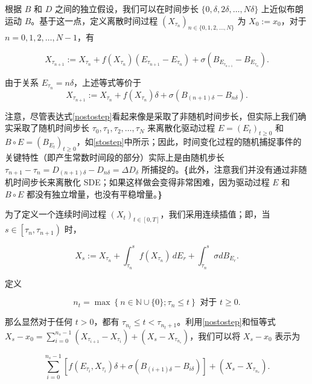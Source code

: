 根据 \( B \) 和 \( D \) 之间的独立假设，我们可以在时间步长 \(\{0, \delta, 2\delta, \ldots, N\delta\}\) 上近似布朗运动 \( B \)。基于这一点，定义离散时间过程 \(\left(X_{\tau_n}\right)_{n\in\{0,1,2,\ldots, N\}}\) 为 \( X_0 := x_0 \)，对于 \( n = 0, 1, 2, \ldots, N-1 \)，有

\begin{equation}\label{stostep}
	X_{\tau_{n+1}} := X_{\tau_n}  + f\left(X_{\tau_n}\right)\left(E_{\tau_{n+1}}-E_{\tau_n}\right)  + \sigma\left(B_{E_{\tau_{n+1}}}-B_{E_{\tau_n}}\right).
\end{equation}


由于关系 \( E_{\tau_{n}} = n\delta \)，上述等式等价于
\begin{equation}\label{nostostep}
	X_{\tau_{n+1}} :=X_{\tau_n}  + f\left(X_{\tau_n}\right)\delta + \sigma\left(B_{(n+1)\delta}-B_{n\delta}\right).
\end{equation}

注意，尽管表达式\cref{nostostep}看起来像是采取了非随机时间步长，但实际上我们确实采取了随机时间步长 \(\tau_0, \tau_1, \tau_2, \ldots, \tau_N\) 来离散化驱动过程 \( E = \left(E_t\right)_{t \geq 0} \) 和 \( B \circ E = \left(B_{E_t}\right)_{t \geq 0} \)，如\cref{stostep}中所示；因此，时间变化过程的随机捕捉事件的关键特性（即产生常数时间段的部分）实际上是由随机步长 \(\tau_{n+1} - \tau_n = D_{(n+1)\delta} - D_{n\delta} = \Delta D_{\delta}\) 所捕捉的。\textbf{\{}此外，注意我们并没有通过非随机时间步长来离散化 SDE；如果这样做会变得非常困难，因为驱动过程 \( E \) 和 \( B \circ E \) 都没有独立增量，也没有平稳增量。\textbf{\}}

为了定义一个连续时间过程 \(\left(X_t\right)_{t\in[0, T]}\)，我们采用连续插值；即，当 \(s \in \left[\tau_n, \tau_{n+1}\right)\) 时，

\begin{equation}
	X_s:= X_{\tau_n} +  \int_{\tau_n}^s f\left(X_{\tau_n}\right) \, dE_r + \int_{\tau_n}^s \sigma dB_{E_r}.
\end{equation}


定义

\[
n_t = \max\left\{n \in \mathbb{N} \cup \{0\}; \tau_n \leq t\right\} \text{ 对于 } t \geq 0.
\]

那么显然对于任何 \( t > 0 \)，都有 \( \tau_{n_t} \leq t < \tau_{n_t+1} \)。利用\cref{nostostep}和恒等式 \( X_s - x_0 = \sum_{i=0}^{n_s-1} \left(X_{\tau_{i+1}} - X_{\tau_i}\right) + \left(X_s - X_{\tau_{n_s}}\right) \)，我们可以将 \( X_s - x_0 \) 表示为

\[
\sum_{i=0}^{n_s-1} \left[ f\left(E_{\tau_i}, X_{\tau_i}\right)\delta + \sigma\left(B_{(i+1)\delta} - B_{i\delta}\right)\right] + \left(X_s - X_{\tau_{n_s}}\right).
\]

